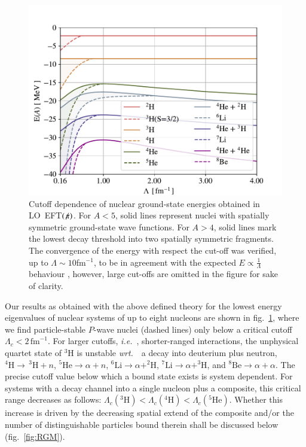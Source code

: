 \documentclass[preprint,12pt]{elsarticle}
\newcommand{\lc}{\ensuremath{\Lambda_c}}
\newcommand{\fm}{\ensuremath{\,\text{fm}^{-1}}}
\newcommand{\wrt}{\textit{wrt.}~}
\newcommand{\ie}{\textit{i.e.}~}
\newcommand{\eftnopi}{\mbox{EFT$(\not \! \pi)$}}
\begin{document}
\begin{figure}
\centering
\includegraphics[width=\linewidth]{./Nuclear.pdf} 
\caption{Cutoff dependence of nuclear ground-state energies
obtained in LO~\eftnopi. For $A<5$, solid lines represent nuclei with
spatially symmetric ground-state wave functions. For $A>4$,
solid lines mark the lowest decay threshold into two spatially symmetric fragments.
The convergence of the energy with respect the cut-off was verified, up to $\Lambda\sim 10$fm$^{-1}$, to be in agreement with the expected $E\propto\tfrac{1}{\Lambda}$ behaviour \cite{Bedaque:1998kg, Barnea:2013uqa}, however, large cut-offs are omitted in the figure for sake of clarity.}
\label{fig:nuclear}
\end{figure}

Our results as obtained with the above defined theory
for the lowest energy eigenvalues of nuclear systems of up to eight nucleons are shown
in fig.~\ref{fig:nuclear},
where we find particle-stable $P$-wave nuclei (dashed lines) only below a critical cutoff $\lc<2\fm$.
For larger cutoffs, \ie, shorter-ranged interactions,
the unphysical quartet state of $^3$H is unstable \wrt~a decay into deuterium plus neutron, \mbox{$^4\text{H}\to\,^3\text{H} + n$},
\mbox{$^5\text{He}\to\alpha +n$}, \mbox{$^6\text{Li}\to\alpha+^2\text{H}$}, \mbox{$^7\text{Li}\to\alpha + ^3\text{H}$},
 and \mbox{$^8\text{Be}\to \alpha+\alpha$}.
The precise cutoff value below which a bound state exists is system dependent.
For systems with a decay channel into a single nucleon plus a composite, this critical range decreases as follows:
\mbox{$\lc(^3\text{H})<\lc(^4\text{H})<\lc(^5\text{He})$}. Whether this increase is driven by the decreasing spatial
 extend of the composite and/or
the number of distinguishable particles bound therein shall be discussed below (fig.~\ref{fig:RGM}).
\end{document}
